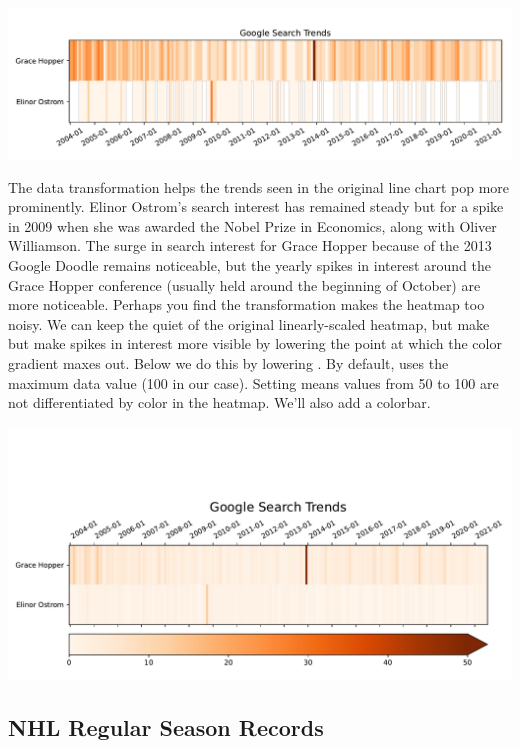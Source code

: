 
\begin{center}
    \includegraphics[width = .8\textwidth]{figures/poetryplots/heat-log.pdf}
\end{center}

The data transformation helps the trends seen in the original line chart pop more prominently. Elinor Ostrom's search interest has remained steady but for a spike in 2009 when she was awarded the Nobel Prize in Economics, along with Oliver Williamson. The surge in search interest for Grace Hopper because of the 2013 Google Doodle remains noticeable, but the yearly spikes in interest around the Grace Hopper conference (usually held around the beginning of October) are more noticeable. Perhaps you find the transformation makes the heatmap too noisy. We can keep the quiet of the original linearly-scaled heatmap, but make but make spikes in interest more visible by lowering the point at which the color gradient maxes out. Below we do this by lowering . By default,  uses the maximum data value (100 in our case). Setting  means values from 50 to 100 are not differentiated by color in the heatmap. We'll also add a colorbar.


\begin{center}
    \includegraphics[width = .8\textwidth]{figures/poetryplots/heat-cbar.pdf}
\end{center}


\subsection{NHL Regular Season Records}


